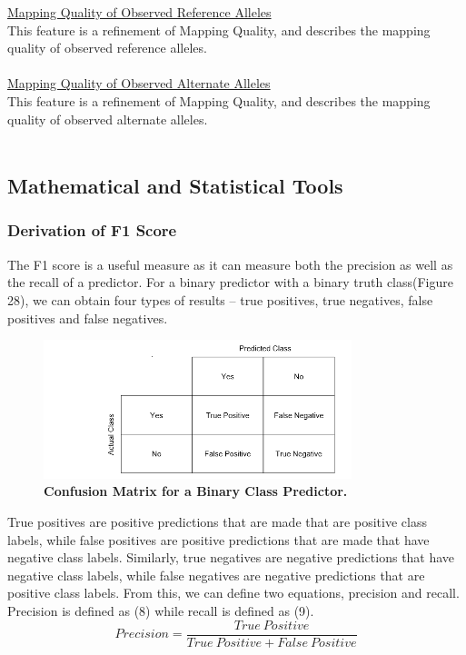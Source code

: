 \documentclass{article}
\begin{document}
\underline{Mapping Quality of Observed Reference Alleles}\\
This feature is a refinement of Mapping Quality, and describes the mapping quality of observed reference alleles.\\\\
\underline{Mapping Quality of Observed Alternate Alleles}\\
This feature is a refinement of Mapping Quality, and describes the mapping quality of observed alternate alleles.\\\\
\newpage
\subsection{Mathematical and Statistical Tools}
\subsubsection{Derivation of F1 Score}
The F1 score is a useful measure as it can measure both the precision as well as the recall of a predictor. For a binary predictor with a binary truth class(Figure 28), we can obtain four types of results -- true positives, true negatives, false positives and false negatives. 
\begin{figure}[H]
\includegraphics[width=0.8\textwidth]{confusionmatrix.png}
\caption{\textbf{Confusion Matrix for a Binary Class Predictor.}}
\centering
\end{figure}
True positives are positive predictions that are made that are positive class labels, while false positives are positive predictions that are made that have negative class labels. Similarly, true negatives are negative predictions that have negative class labels, while false negatives are negative predictions that are positive class labels. From this, we can define two equations, precision and recall. Precision is defined as (8) while recall is defined as (9). 
\begin{equation}
Precision = \frac{True \ Positive}{True\  Positive + False \ Positive} 
\end{equation}
\end{document}

